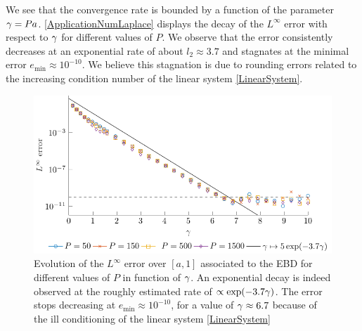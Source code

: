 \documentclass[smallextended]{svjour3}
\begin{document}
\begin{remark}
	We see that the convergence rate is bounded by a function of the parameter $\gamma = Pa$. \autoref{ApplicationNumLaplace} displays the decay of the $L^\infty$ error with respect to $\gamma$ for different values of $P$. We observe that the error consistently decreases at an exponential rate of about $l_2 \approx 3.7$ and stagnates at the minimal error $e_{\min} \approx 10^{-10}$. We believe this stagnation is due to rounding errors related to the increasing condition number of the linear system \eqref{LinearSystem}.  
\end{remark}
\begin{figure}[t]
	\centering
	\includegraphics[scale = 0.7]{ApplicationNumLaplace}			
	\caption{Evolution of the $L^{\infty}$ error over $[a,1]$ associated to the EBD for different values of $P$ in function of $\gamma$. An exponential decay is indeed observed at the roughly estimated rate of $\propto \exp(-3.7\gamma)$. The error stops decreasing at $e_{\min} \approx 10^{-10}$, for a value of $\gamma \approx 6.7$ because of the ill conditioning of the linear system \eqref{LinearSystem}}
	\label{ApplicationNumLaplace}
\end{figure}
\end{document}
